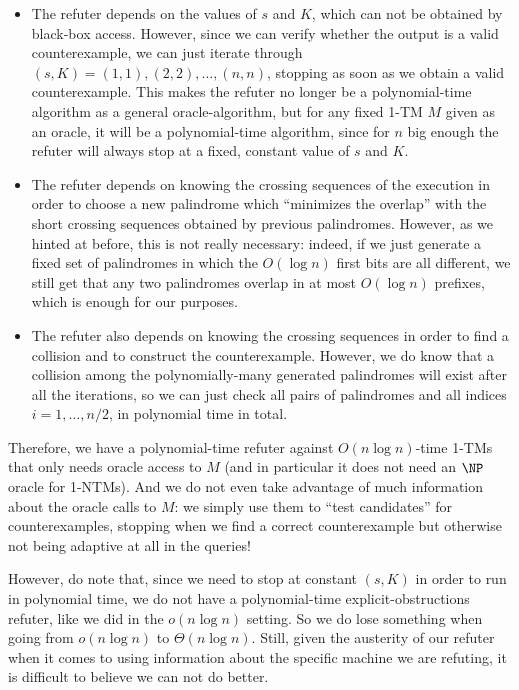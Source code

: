 \begin{itemize}
    \item The refuter depends on the values of $s$ and $K$, which can not be obtained by black-box access. However,
    since we can verify whether the output is a valid counterexample, we can just iterate through
    $(s, K) = (1, 1), (2, 2), \ldots, (n, n)$, stopping as soon as we obtain a valid counterexample. 
    This makes the refuter no longer be a polynomial-time algorithm as a general oracle-algorithm, but for
    any fixed 1-TM $M$ given as an oracle, it will be a polynomial-time algorithm, since for $n$ big enough
    the refuter will always stop at a fixed, constant value of $s$ and $K$. 
    \item The refuter depends on knowing the crossing sequences of the execution in order to choose a new palindrome
    which ``minimizes the overlap'' with the short crossing sequences obtained by previous palindromes. 
    However, as we hinted at before, this is not really necessary: indeed, if we just generate a fixed set 
    of palindromes in which the $O(\log n)$ first bits are all different, we still get that any two palindromes
    overlap in at most $O(\log n)$ prefixes, which is enough for our purposes. 
    \item The refuter also depends on knowing the crossing sequences in order to find a collision and to construct
    the counterexample. However, we do know that a collision among the polynomially-many generated palindromes will exist
    after all the iterations, so we can just check all pairs of palindromes and all indices $i = 1, \ldots, n/2$, in 
    polynomial time in total. 
\end{itemize}

Therefore, we have a polynomial-time refuter against $O(n \log n)$-time 1-TMs that only needs oracle access to $M$
(and in particular it does not need an $\NP$ oracle for 1-NTMs). And we do not even take advantage of much information about
the oracle calls to $M$: we simply use them to ``test candidates'' for counterexamples, stopping when we find a correct
counterexample but otherwise not being adaptive at all in the queries!

However, do note that, since we need to stop at constant $(s, K)$ in order to run in polynomial time, we do not have 
a polynomial-time explicit-obstructions refuter, like we did in the $o(n \log n)$ setting. So we do lose something
when going from $o(n \log n)$ to $\Theta(n \log n)$. Still, given the austerity of our refuter when it comes to using
information about the specific machine we are refuting, it is difficult to believe we can not do better. 


